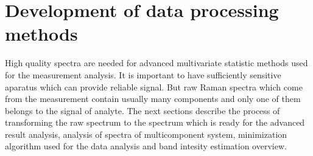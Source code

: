 \section{Development of data processing methods}

High quality spectra are needed for advanced multivariate statistic methods
used for the measurement analysis.
It is important to have sufficiently sensitive aparatus which can provide
reliable signal.
But raw Raman spectra which come from the measurement contain usually many
components and only one of them belongs to the signal of analyte.
The next sections describe the process of transforming the raw spectrum
to the spectrum which is ready for the advanced result analysis, analysis
of spectra of multicomponent system, minimization algorithm used for the
data analysis and band intesity estimation overview.







